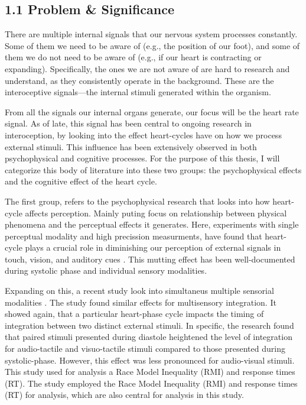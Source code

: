 \documentclass[12pt,oneside,openright]{report}
\begin{document}
\subsection*{1.1 Problem \& Significance}
There are multiple internal signals that our nervous system processes constantly. Some of them we need to be aware of (e.g., the position of our foot), and some of them we do not need to be aware of (e.g., if our heart is contracting or expanding). Specifically, the ones we are not aware of are hard to research and understand, as they consistently operate in the background. These are the interoceptive signals—the internal stimuli generated within the organism.

From all the signals our internal organs generate, our focus will be the heart rate signal. As of late, this signal has been central to ongoing research in interoception, by looking into the effect heart-cycles have on how we process external stimuli. This influence has been extensively observed in both psychophysical and cognitive processes. For the purpose of this thesis, I will  categorize this body of literature into these two groups: the psychophysical effects and the cognitive effect of the heart cycle.

The first group, refers to the psychophysical research that looks into how heart-cycle affects perception. Mainly puting focus on relationship between physical phenomena and the perceptual effects it generates. Here, experiments with single perceptual modality and high precission measurments, have found that heart-cycle plays a crucial role in diminishing our perception of external signals in touch, vision, and auditory cues \parencite{Sandman1977-li, esra_p, AL2021118247, Grund643, motyka, Park2014}. This mutting effect has been well-documented during systolic phase and individual sensory modalities. 

Expanding on this, a recent study look into simultaneus multiple sensorial modalities \parencite{SALTAFOSSI2023108642}. The study found similar effects for multisensory integration. It showed again, that a particular heart-phase cycle impacts the timing of integration between two distinct external stimuli. In specific, the research found that paired stimuli presented during diastole heightened the level of integration for audio-tactile and visuo-tactile stimuli compared to those presented during systolic-phase. However, this effect was less pronounced for audio-visual stimuli. This study used for analysis a Race Model Inequality (RMI) and response times (RT). The study employed the Race Model Inequality (RMI) and response times (RT) for analysis, which are also central for analysis in this study.
\end{document}
